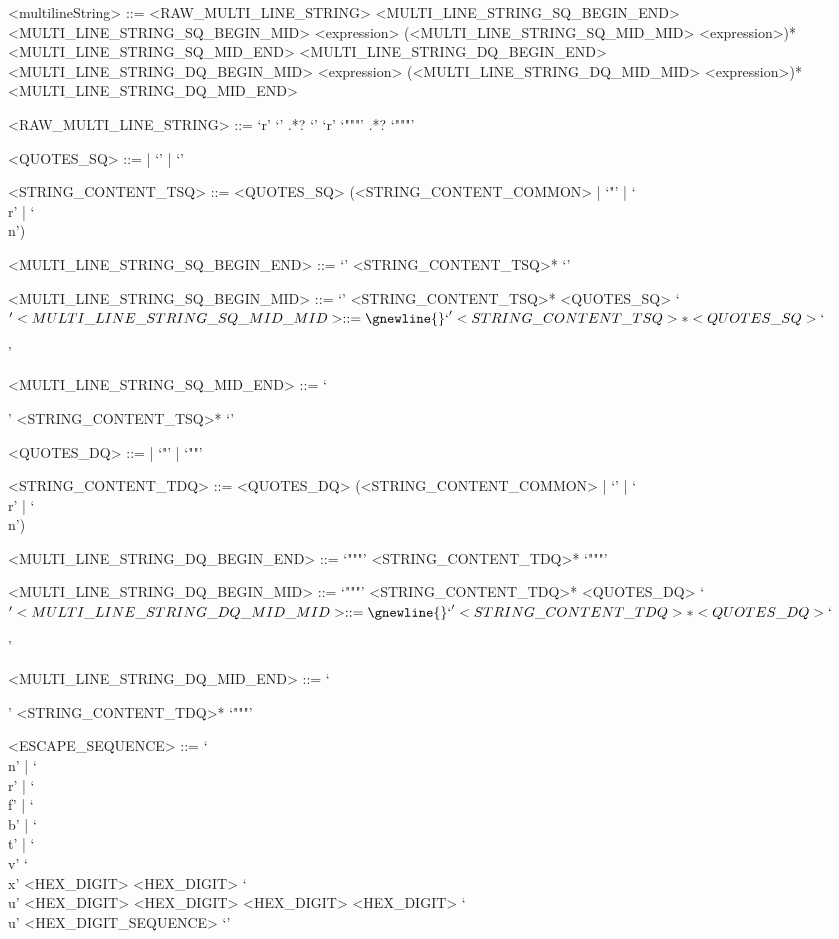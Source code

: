 \documentclass[makeidx]{article}
\begin{document}
{\begin{grammar}
<multilineString> ::= <RAW\_MULTI\_LINE\_STRING>
  \alt <MULTI\_LINE\_STRING\_SQ\_BEGIN\_END>
  \alt <MULTI\_LINE\_STRING\_SQ\_BEGIN\_MID> <expression> \gnewline{}
       (<MULTI\_LINE\_STRING\_SQ\_MID\_MID> <expression>)* \gnewline{}
       <MULTI\_LINE\_STRING\_SQ\_MID\_END>
  \alt <MULTI\_LINE\_STRING\_DQ\_BEGIN\_END>
  \alt <MULTI\_LINE\_STRING\_DQ\_BEGIN\_MID> <expression> \gnewline{}
       (<MULTI\_LINE\_STRING\_DQ\_MID\_MID> <expression>)* \gnewline{}
       <MULTI\_LINE\_STRING\_DQ\_MID\_END>

<RAW\_MULTI\_LINE\_STRING> ::= `r' `\sqsqsq' .*? `\sqsqsq'
  \alt `r' `"""' .*? `"""'

<QUOTES\_SQ> ::= | `\sq' | `\sqsq'

<STRING\_CONTENT\_TSQ> ::= \gnewline{}
  <QUOTES\_SQ> (<STRING\_CONTENT\_COMMON> | `"' | `\\r' | `\\n')

<MULTI\_LINE\_STRING\_SQ\_BEGIN\_END> ::= \gnewline{}
  `\sqsqsq' <STRING\_CONTENT\_TSQ>* `\sqsqsq'

<MULTI\_LINE\_STRING\_SQ\_BEGIN\_MID> ::= \gnewline{}
  `\sqsqsq' <STRING\_CONTENT\_TSQ>* <QUOTES\_SQ> `${'

<MULTI\_LINE\_STRING\_SQ\_MID\_MID> ::= \gnewline{}
  `}' <STRING\_CONTENT\_TSQ>* <QUOTES\_SQ> `${'

<MULTI\_LINE\_STRING\_SQ\_MID\_END> ::= \gnewline{}
  `}' <STRING\_CONTENT\_TSQ>* `\sqsqsq'

<QUOTES\_DQ> ::= | `"' | `""'

<STRING\_CONTENT\_TDQ> ::= \gnewline{}
  <QUOTES\_DQ> (<STRING\_CONTENT\_COMMON> | `\sq' | `\\r' | `\\n')

<MULTI\_LINE\_STRING\_DQ\_BEGIN\_END> ::= \gnewline{}
  `"""' <STRING\_CONTENT\_TDQ>* `"""'

<MULTI\_LINE\_STRING\_DQ\_BEGIN\_MID> ::= \gnewline{}
  `"""' <STRING\_CONTENT\_TDQ>* <QUOTES\_DQ> `${'

<MULTI\_LINE\_STRING\_DQ\_MID\_MID> ::= \gnewline{}
  `}' <STRING\_CONTENT\_TDQ>* <QUOTES\_DQ> `${'

<MULTI\_LINE\_STRING\_DQ\_MID\_END> ::= \gnewline{}
  `}' <STRING\_CONTENT\_TDQ>* `"""'

<ESCAPE\_SEQUENCE> ::= `\\n' | `\\r' | `\\f' | `\\b' | `\\t' | `\\v'
  \alt `\\x' <HEX\_DIGIT> <HEX\_DIGIT>
  \alt `\\u' <HEX\_DIGIT> <HEX\_DIGIT> <HEX\_DIGIT> <HEX\_DIGIT>
  \alt `\\u{' <HEX\_DIGIT\_SEQUENCE> `}'


\end{grammar}}
\end{document}
